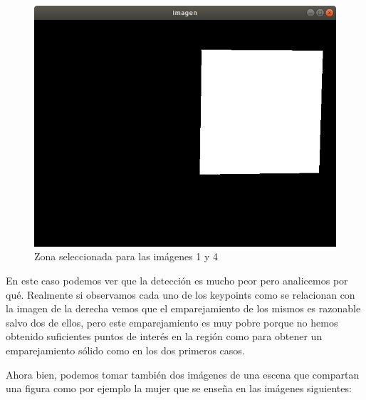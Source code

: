 \documentclass[12pt,a4paper]{article}
\begin{document}
\begin{figure}[H]
	\centering
	\includegraphics[scale=0.3]{./Imagenes/Ejercicio1-mascara3.png}
	\caption{Zona seleccionada para las imágenes 1 y 4}
\end{figure}

En este caso podemos ver que la detección es mucho peor pero analicemos por qué. Realmente si observamos cada uno de los keypoints como se relacionan con la imagen de la derecha vemos que el emparejamiento de los mismos es razonable salvo dos de ellos, pero este emparejamiento es muy pobre porque no hemos obtenido suficientes puntos de interés en la región como para obtener un emparejamiento sólido como en los dos primeros casos.

\vspace{10px}

Ahora bien, podemos tomar también dos imágenes de una escena que compartan una figura como por ejemplo la mujer que se enseña en las imágenes siguientes:
\end{document}
